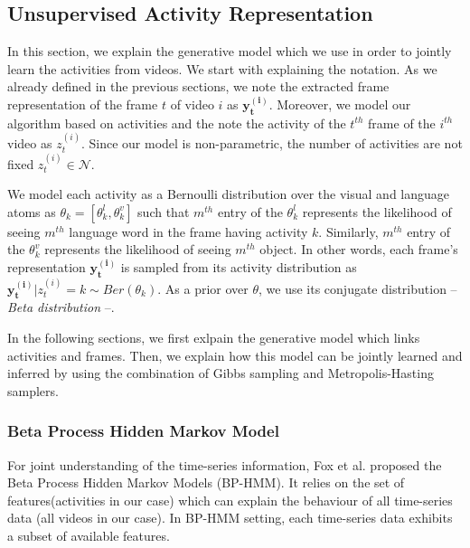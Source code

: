\subsection{Unsupervised Activity Representation}
\label{basics}
In this section, we explain the generative model which we use in order to jointly learn the activities from videos. We start with explaining the notation. As we already defined in the previous sections, we note the extracted frame representation of the frame $t$ of video $i$ as $\mathbf{y^{(i)}_t}$. Moreover, we model our algorithm based on activities and the note the activity of the $t^{th}$ frame of the $i^{th}$ video as $z^{(i)}_t$. Since our model is non-parametric, the number of activities are not fixed \ie  $z^{(i)}_t \in \mathcal{N}$.


We model each activity as a Bernoulli distribution over the visual and language atoms as $\theta_k=[\theta_k^l,\theta_k^v]$ such that $m^{th}$ entry of the $\theta_k^l$ represents the likelihood of seeing $m^{th}$ language word in the frame having activity $k$. Similarly, $m^{th}$ entry of the $\theta_k^v$ represents the likelihood of seeing $m^{th}$ object. In other words, each frame's representation $\mathbf{y^{(i)}_t}$ is sampled from its activity distribution as \mbox{$\mathbf{y^{(i)}_t}|z^{(i)}_t=k \sim Ber(\theta_k)$}. As a prior over $\theta$, we use its conjugate distribution -- \emph{Beta distribution} --.

In the following sections, we first exlpain the generative model which links activities and frames. Then, we explain how this model can be jointly learned and inferred by using the combination of Gibbs sampling and Metropolis-Hasting samplers.
\subsubsection{Beta Process Hidden Markov Model}
For joint understanding of the time-series information, Fox et al.\cite{foxBPHMM} proposed the Beta Process Hidden Markov Models (BP-HMM). It relies on the set of features(activities in our case) which can explain the behaviour of all time-series data (all videos in our case). In BP-HMM setting, each time-series data exhibits a subset of available features.

